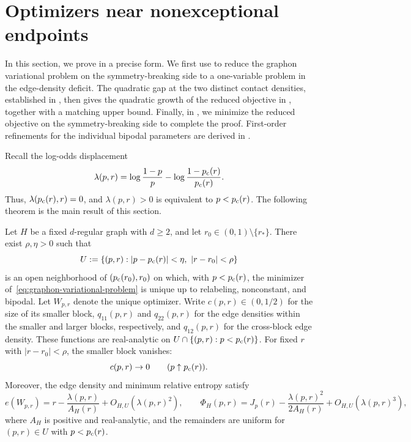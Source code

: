 \section{Optimizers near nonexceptional endpoints}
\label{sec:nonexceptional-endpoint}

In this section, we prove  in a precise form.
We first use  to reduce the graphon variational
problem on the symmetry-breaking side to a one-variable problem in the
edge-density deficit.  The quadratic gap at the two distinct contact densities,
established in , then gives the quadratic growth of the
reduced objective in , together with
a matching upper bound.
Finally, in , we minimize the reduced
objective on the symmetry-breaking side to complete the proof.
First-order refinements for the individual bipodal parameters are derived in
.

Recall the log-odds displacement
\[
  \lambda(p,r)=
  \log\frac{1-p}{p}-\log\frac{1-p_{\mathrm c}(r)}{p_{\mathrm c}(r)}.
\]
Thus, $\lambda(p_{\mathrm c}(r),r)=0$, and $\lambda(p,r)>0$ is equivalent to
$p<p_{\mathrm c}(r)$.  The following theorem is the main result of this section.

\begin{theorem}\label{thm:nonexceptional-endpoint}
Let $H$ be a fixed $d$-regular graph with $d\ge2$, and let
$r_0\in(0,1)\setminus\{r_*\}$.
There exist $\rho,\eta>0$ such that
\[
  U:=\{(p,r): |p-\pc(r)|<\eta,\ |r-r_0|<\rho\}
\]
is an open neighborhood of $(p_{\mathrm c}(r_0),r_0)$ on which, with $p < p_{\mathrm c}(r)$,
the minimizer of~\eqref{eq:graphon-variational-problem}
is unique up to relabeling, nonconstant, and bipodal.
Let $W_{p,r}$ denote the unique optimizer.
Write $c(p,r)\in(0,1/2)$ for the size of its smaller block,
$q_{11}(p,r)$ and $q_{22}(p,r)$ for the edge densities within the
smaller and larger blocks, respectively, and $q_{12}(p,r)$ for the
cross-block edge density.  These functions are real-analytic on $U\cap\{(p,r):p<p_{\mathrm c}(r)\}$.
For fixed $r$ with $|r-r_0|<\rho$, the smaller block vanishes:
\[
  c(p,r)\to0 \qquad (p \uparrow p_{\mathrm c}(r)).
\]
Moreover, the edge density and minimum relative entropy satisfy
\begin{equation}\label{eq:optimizer-expansion}
  e(W_{p,r})=r-\frac{\lambda(p,r)}{A_H(r)}+O_{H,U}(\lambda(p,r)^2),
  \qquad
  \Phi_H(p,r)=J_p(r)-\frac{\lambda(p,r)^2}{2A_H(r)}+O_{H,U}(\lambda(p,r)^3),
\end{equation}
where $A_H$ is positive and real-analytic, and the remainders are uniform
for $(p,r)\in U$ with $p<p_{\mathrm c}(r)$.
\end{theorem}




